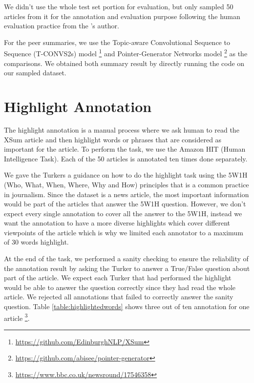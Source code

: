 \documentclass[11pt,a4paper]{article}
\begin{document}
We didn't use the whole test set portion for evaluation, but only sampled 50 articles from it for the annotation and evaluation purpose following the human evaluation practice from the \citet{Shashi2018}'s author.

For the peer summaries, we use the Topic-aware Convolutional Sequence to Sequence (T-CONVS2s) model \footnote{\url{https://github.com/EdinburghNLP/XSum}} \citep{Shashi2018} and Pointer-Generator Networks model \footnote{\url{https://github.com/abisee/pointer-generator}} \citep{See2017} as the comparisons. We obtained both summary result by directly running the code on our sampled dataset. 

\section{Highlight Annotation}
The highlight annotation is a manual process where we ask human to read the XSum article and then highlight words or phrases that are considered as important for the article. To perform the task, we use the Amazon HIT (Human Intelligence Task). Each of the 50 articles is annotated ten times done separately. 

We gave the Turkers a guidance on how to do the highlight task using the 5W1H (Who, What, When, Where, Why and How) principles \citep{Robertson1946} that is a common practice in journalism. Since the dataset is a news article, the most important information would be part of the articles that answer the 5W1H question. However, we don't expect every single annotation to cover all the answer to the 5W1H, instead we want the annotation to have a more diverse highlights which cover different viewpoints of the article which is why we limited each annotator to a maximum of 30 words highlight.

At the end of the task, we performed a sanity checking to ensure the reliability of the annotation result by asking the Turker to answer a True/False question about part of the article. We expect each Turker that had performed the highlight would be able to answer the question correctly since they had read the whole article. We rejected all annotations that failed to correctly answer the sanity question. Table \ref{table:highlightedwords} shows three out of ten annotation for one article \footnote{\url{https://www.bbc.co.uk/newsround/17546358}}. 
\end{document}
